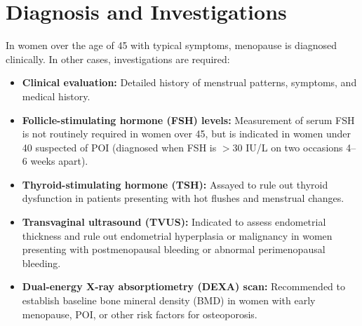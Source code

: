 \section*{Diagnosis and Investigations}
In women over the age of 45 with typical symptoms, menopause is diagnosed clinically. In other cases, investigations are required:
\begin{itemize}
    \item \textbf{Clinical evaluation:} Detailed history of menstrual patterns, symptoms, and medical history.
    \item \textbf{Follicle-stimulating hormone (FSH) levels:} Measurement of serum FSH is not routinely required in women over 45, but is indicated in women under 40 suspected of POI (diagnosed when FSH is $>30$ IU/L on two occasions 4--6 weeks apart).
    \item \textbf{Thyroid-stimulating hormone (TSH):} Assayed to rule out thyroid dysfunction in patients presenting with hot flushes and menstrual changes.
    \item \textbf{Transvaginal ultrasound (TVUS):} Indicated to assess endometrial thickness and rule out endometrial hyperplasia or malignancy in women presenting with postmenopausal bleeding or abnormal perimenopausal bleeding.
    \item \textbf{Dual-energy X-ray absorptiometry (DEXA) scan:} Recommended to establish baseline bone mineral density (BMD) in women with early menopause, POI, or other risk factors for osteoporosis.
\end{itemize}

